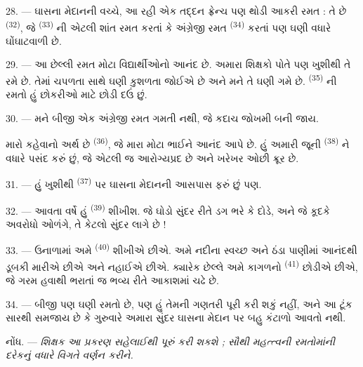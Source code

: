 28. --- ઘાસના મેદાનની વચ્ચે, આ રહી એક તદ્દન ફ્રેન્ચ પણ થોડી આકરી રમત :
તે છે \textsuperscript{(32)}, જે
\textsuperscript{(33)} ની એટલી શાંત રમત કરતાં કે અંગ્રેજી
રમત \textsuperscript{(34)} કરતાં પણ ઘણી વધારે ઘોંઘાટવાળી
છે.

29. --- આ છેલ્લી રમત મોટા વિદ્યાર્થીઓનો આનંદ છે. અમારા શિક્ષકો પોતે
પણ ખુશીથી તે રમે છે. તેમાં ચપળતા સાથે ઘણી કુશળતા જોઈએ છે અને મને તે
ઘણી ગમે છે. \textsuperscript{(35)} ની રમતો હું છોકરીઓ
માટે છોડી દઉં છું.

30. --- મને બીજી એક અંગ્રેજી રમત ગમતી નથી, જે કદાચ જોખમી બની જાય.

મારો કહેવાનો અર્થ છે \textsuperscript{(36)}, જે મારા
મોટા ભાઈને આનંદ આપે છે. હું અમારી જૂની \textsuperscript{(38)}
ને વધારે પસંદ કરું છું, જે એટલી જ આરોગ્યપ્રદ છે અને ખરેખર ઓછી ક્રૂર
છે.

\VUsaut{4.6mm}
\VUsaut{3.0mm}

31. --- હું ખુશીથી \textsuperscript{(37)} પર ઘાસના
મેદાનની આસપાસ ફરું છું પણ.

32. --- આવતા વર્ષે હું \textsuperscript{(39)} શીખીશ.
જે ઘોડો સુંદર રીતે ડગ ભરે કે દોડે, અને જે કૂદકે અવરોધો ઓળંગે, તે કેટલો
સુંદર લાગે છે !

33. --- ઉનાળામાં અમે \textsuperscript{(40)} શીખીએ છીએ.
અમે નદીના સ્વચ્છ અને ઠંડા પાણીમાં આનંદથી ડૂબકી મારીએ છીએ અને નહાઈએ
છીએ. ક્યારેક છેલ્લે અમે કાગળનો \textsuperscript{(41)}
છોડીએ છીએ, જે ગરમ હવાથી ભરાતાં જ ભવ્ય રીતે આકાશમાં ચઢે છે.

34. --- બીજી પણ ઘણી રમતો છે, પણ હું તેમની ગણતરી પૂરી કરી શકું નહીં,
અને આ ટૂંક સારથી સમજાય છે કે ગુરુવારે અમારા સુંદર ઘાસના મેદાન પર બહુ
કંટાળો આવતો નથી.

નોંધ. --- \textit{શિક્ષક આ પ્રકરણ સહેલાઈથી પૂરું કરી શકશે ; સૌથી
મહત્ત્વની રમતોમાંની દરેકનું વધારે વિગતે વર્ણન કરીને.}

\VUsaut{6.0mm}
\VUfilet{22mm}
